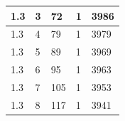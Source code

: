 \documentclass{VUMIFInfKursinis}
\begin{document}
\begin{table}[!ht]
\begin{tabular}{|l|l|l|l|l|}
1.3        & 3            & 72                 & 1                         & 3986                                      \\ \hline
1.3        & 4            & 79                 & 1                         & 3979                                      \\ \hline
1.3        & 5            & 89                 & 1                         & 3969                                      \\ \hline
1.3        & 6            & 95                 & 1                         & 3963                                      \\ \hline
1.3        & 7            & 105                & 1                         & 3953                                      \\ \hline
1.3        & 8            & 117                & 1                         & 3941                                      \\ \hline
\end{tabular}
\end{table}
\end{document}
